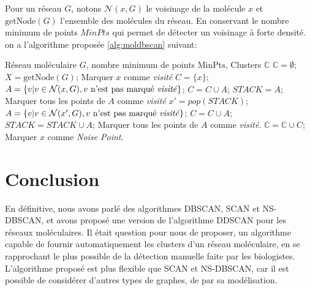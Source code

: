 \documentclass[12pt, french, latin.medieval, a4paper]{report}
\begin{document}
   	 Pour un réseau $G$, notons $\mathcal{N}(x,G)$ le voisinage de la molécule $x$ et $\text{getNode}(G)$ l'ensemble des molécules du réseau.
   	 En conservant le nombre minimum de points $MinPts$ qui permet de détecter un voisinage à forte densité.
   	 on a l'algorithme proposée \ref{alg:moldbscan} suivant:

   	 \begin{algorithm}[H]
   		 \caption{Pseudo-code de l'algorithme proposé}
   		 \label{alg:moldbscan}
   		 \begin{algorithmic}[1]
   		 \REQUIRE Réseau moléculaire $G$, nombre minimum de points $\text{MinPts}$,
   		 \ENSURE Clusters $\mathbb{C}$
   		 \STATE $\mathbb{C} = \emptyset $;
   		 \STATE $X = \text{getNode}(G)$;
       			 \STATE Marquer $x$ comme \textit{visité}
       				 \STATE $C = \{ x \}$;
       				 \STATE $A = \{ v | v \in \mathcal{N}(x, G), v \text{ n'est pas marqué \textit{visité}} \}$;
       				 \STATE $C = C \cup A$;
       				 \STATE $STACK = A$;
                      \STATE Marquer tous les points de $A$ comme \textit{visité}
       					 \STATE $x' = pop(STACK)$;
       						 \STATE $A = \{ v | v \in \mathcal{N}(x', G), v \text{ n'est pas marqué \textit{visité}} \}$;
       						 \STATE $C = C \cup A$;
       						 \STATE $STACK = STACK \cup A$;
       						 \STATE Marquer tous les points de $A$ comme \textit{visité}.
       					 \ENDIF
       				 \ENDWHILE
       				 \STATE $\mathbb{C} = \mathbb{C} \cup C$;
       			 \ELSE
       				 \STATE Marquer $x$ comme \textit{Noise Point}.
       			 \ENDIF
              \ENDIF
   		 \ENDFOR

   		 \end{algorithmic}
   	 \end{algorithm}

    
\section{Conclusion}

    En définitive, nous avons parlé des algorithmes DBSCAN, SCAN et NS-DBSCAN, et avons proposé une version de l'algorithme DDSCAN pour les réseaux moléculaires.
    Il était question pour nous de proposer, un algorithme capable de fournir automatiquement les clusters d'un réseau moléculaire, en se rapprochant le plus possible de la détection manuelle faite par les biologistes.
    L'algorithme proposé est plus flexible que SCAN et NS-DBSCAN, car il est possible de considérer d'autres types de graphes, de par sa modélisation.

    
\end{document}
